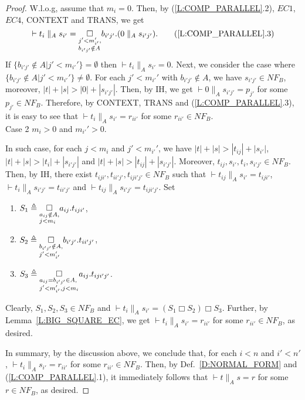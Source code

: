\documentclass{elsarticle}
\theoremstyle{plain}
\theoremstyle{definition}
\begin{document}
\begin{proof}
    W.l.o.g, assume that $m_i=0$. Then, by (\ref{L:COMP_PARALLEL}.2), $EC1$, $EC4$, CONTEXT and TRANS, we get
    \[ \vdash t_i \parallel_A s_{i'} = \underset {\begin{subarray}
                   \;j'< m_{i'}',\\
                   b_{i'j'} \notin A
                \end{subarray}}
                \square
                b_{i'j'}.( 0 \parallel_A s_{i'j'}). \tag{\ref{L:COMP_PARALLEL}.3}\]
    If $\{b_{i'j'} \notin A|j'<m_{i'}'\}=\emptyset$ then $\vdash t_i \parallel_A s_{i'} = 0$.
    Next, we consider the case where $\{b_{i'j'}\notin A|j'<m_{i'}'\} \not= \emptyset$.
    For each $j' < m_{i'}'$ with $b_{i'j'}\notin A$, we have $s_{i'j'}\in NF_B$, moreover, $|t|+|s|>|0|+|s_{i'j'}|$.
    Then, by IH, we get $\vdash 0\parallel_A s_{i'j'} = p_{j'}$ for some $p_{j'} \in NF_B$.
    Therefore, by CONTEXT, TRANS and (\ref{L:COMP_PARALLEL}.3), it is easy to see that $\vdash t_i \parallel_A s_{i'} =  r_{ii'}$ for some $r_{ii'} \in NF_B$.\\

\noindent    Case 2 $m_i > 0$ and  $m_{i'}' > 0$.

    In such case, for each $j<m_i$ and $j'<m_{i'}'$, we have $|t|+|s|>|t_{ij}|+|s_{i'}|$, $|t|+|s|>|t_{i}|+|s_{i'j'}|$ and $|t|+|s|>|t_{ij}|+|s_{i'j'}|$.
      Moreover, $t_{ij},s_{i'},t_{i},s_{i'j'}\in NF_B$.
      Then, by IH, there exist $t_{iji'},t_{ii'j'},t_{iji'j'}\in NF_B$ such that $ \vdash  t_{ij} \parallel_A s_{i'} = t_{iji'}$, $\vdash t_{i} \parallel_A s_{i'j'} = t_{ii'j'}$  and $ \vdash  t_{ij} \parallel_A s_{i'j'} =t_{iji'j'}$.
            Set
    \begin{enumerate}
      \item  $S_1 \triangleq \underset{ \begin{subarray} \;a_{ij} \notin A,\\j<m_i\end{subarray}}{\square}a_{ij}.t_{iji'}$,
      \item  $ S_2 \triangleq \underset{ \begin{subarray} \;b_{i'j'} \notin A,\\j'<m_{i'}'\end{subarray}}{\square}b_{i'j'}.t_{ii'j'}$,
      \item $S_3 \triangleq \underset{ \begin{subarray} \;a_{ij} = b_{i'j'}\in A,\\j'<m_{i'}',j<m_i\end{subarray}}{\square}a_{ij}.t_{iji'j'}$.
    \end{enumerate}
    Clearly, $S_1,S_2,S_3\in NF_B$ and $\vdash t_{i}\parallel_A s_{i'}=(S_1 \Box S_2) \Box S_3$.
    Further, by Lemma~\ref{L:BIG_SQUARE_EC}, we get $\vdash t_{i}\parallel_A s_{i'}=r_{ii'}$ for some $r_{ii'} \in NF_B$, as desired.

     In summary, by the discussion above, we conclude that, for each $i<n$ and $i'<n'$, $\vdash t_{i}\parallel_A s_{i'} =r_{ii'}$ for some $r_{ii'}\in NF_B$.
     Then, by Def.~\ref{D:NORMAL_FORM} and (\ref{L:COMP_PARALLEL}.1), it immediately follows that $\vdash t \parallel_A s = r $ for some $r \in NF_B$, as desired.
\end{proof}
\end{document}
